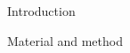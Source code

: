 \documentclass[final,dvipdfmx]{beamer}
\begin{document}
\vspace{10mm}

\begin{columns}[T]
  \begin{column}{0.49\columnwidth}
    \begin{block}{\Large Introduction}
      \begin{figure}
        \begin{flushleft}
          
        \end{flushleft}
      \end{figure}
    \end{block}

    \begin{block}{\Large Material and method}
      \begin{figure}
        \begin{flushleft}
          
        \end{flushleft}
      \end{figure}
    \end{block}

  \end{column}

  \begin{column}{0.49\columnwidth}
    \begin{block}{}
    \end{block}
  \end{column}

\end{columns}
\end{document}
